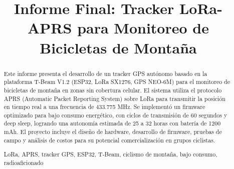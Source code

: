 \documentclass[conference]{IEEEtran}
\begin{document}

\title{Informe Final: Tracker LoRa-APRS para Monitoreo de Bicicletas de Montaña}

\author{
\and
{}
}

\maketitle

\begin{abstract}
Este informe presenta el desarrollo de un tracker GPS autónomo basado en la plataforma T-Beam V1.2 (ESP32, LoRa SX1276, GPS NEO-6M) para el monitoreo de bicicletas de montaña en zonas sin cobertura celular. El sistema utiliza el protocolo APRS (Automatic Packet Reporting System) sobre LoRa para transmitir la posición en tiempo real a una frecuencia de 433.775 MHz. Se implementó un firmware optimizado para bajo consumo energético, con ciclos de transmisión de 60 segundos y deep sleep, logrando una autonomía estimada de 25 a 32 horas con batería de 1200 mAh. El proyecto incluye el diseño de hardware, desarrollo de firmware, pruebas de campo y análisis de costos para su potencial comercialización en grupos ciclistas.

\vspace{0.5cm}
\begin{IEEEkeywords}
LoRa, APRS, tracker GPS, ESP32, T-Beam, ciclismo de montaña, bajo consumo, radioaficionado
\end{IEEEkeywords}
\end{abstract}

\end{document}
